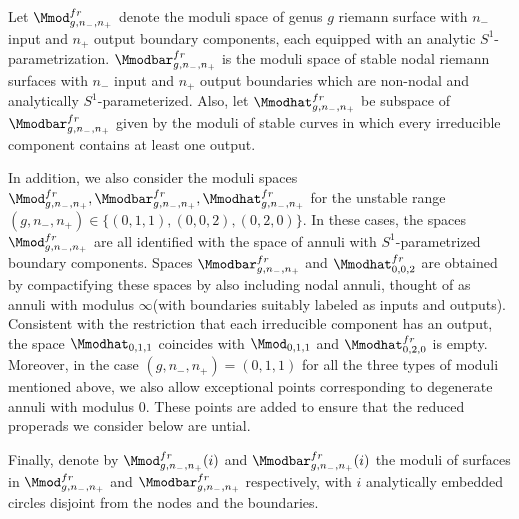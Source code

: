 \documentclass[a4paper,10pt]{amsart}
\begin{document}
Let $\Mmod^{fr}_{g,n_-,n_+}$ denote the moduli space of genus $g$ riemann surface with $n_-$ input and $n_+$ output boundary components, each equipped with an analytic $S^1$-parametrization. $\Mmodbar^{fr}_{g,n_-,n_+}$ is the moduli space of stable nodal riemann surfaces with $n_-$ input and $n_+$ output boundaries which are non-nodal and analytically $S^1$-parameterized. Also, let $\Mmodhat^{fr}_{g,n_-,n_+}$ be subspace of $\Mmodbar^{fr}_{g,n_-,n_+}$ given by the moduli of stable curves in which every irreducible component contains at least one output.

In addition, we also consider the moduli spaces $\Mmod^{fr}_{g,n_-,n_+},\Mmodbar^{fr}_{g,n_-,n_+}, \Mmodhat^{fr}_{g,n_-,n_+}$ for the unstable range $(g,n_-,n_+) \in \{(0,1,1), (0,0,2), (0,2,0)\}$. In these cases, the spaces $\Mmod^{fr}_{g,n_-,n_+}$ are all identified with the space of annuli with $S^1$-parametrized boundary components. Spaces $\Mmodbar^{fr}_{g,n_-,n_+}$ and $\Mmodhat^{fr}_{0,0,2}$ are obtained by compactifying these spaces  by also including nodal annuli, thought of as annuli with modulus $\infty$(with boundaries suitably labeled as inputs and outputs). Consistent with the restriction that each irreducible component has an output, the space $\Mmodhat_{0,1,1}$ coincides with $\Mmod_{0,1,1}$ and $\Mmodhat^{fr}_{0,2,0}$ is empty.
Moreover, in the case $(g,n_-,n_+)=(0,1,1)$ for all the three types of moduli mentioned above, we also allow exceptional points corresponding to degenerate annuli with modulus $0$. These points are added to ensure that the reduced properads we consider below are untial.

Finally, denote by $\Mmod^{fr}_{g,n_-,n_+}(i)$ and $\Mmodbar^{fr}_{g,n_-,n_+}(i)$ the moduli of surfaces in $\Mmod^{fr}_{g,n_-,n_+}$ and $\Mmodbar^{fr}_{g,n_-,n_+}$ respectively, with $i$ analytically embedded circles disjoint from the nodes and the boundaries.

\end{document}
